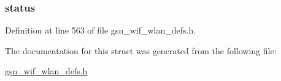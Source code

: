 \hypertarget{a00307_ac4f6d5d1544a8d2c1309479ffe1b61ab}{
\subsubsection[{status}]{ {\bf status}}}
\label{a00307_ac4f6d5d1544a8d2c1309479ffe1b61ab}


Definition at line 563 of file gsn\_\-wif\_\-wlan\_\-defs.h.



The documentation for this struct was generated from the following file:\begin{DoxyCompactItemize}
\item 
\hyperlink{a00613}{gsn\_\-wif\_\-wlan\_\-defs.h}\end{DoxyCompactItemize}
